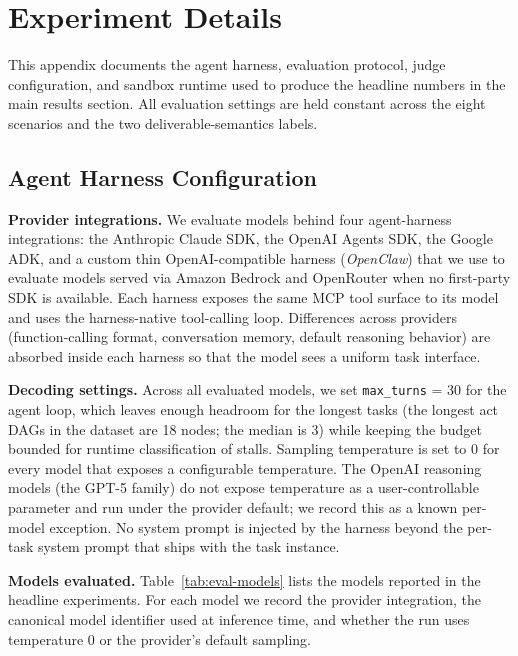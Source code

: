 \section{Experiment Details}
\label{app:experiment}

This appendix documents the agent harness, evaluation protocol, judge configuration, and sandbox runtime used to produce the headline numbers in the main results section. All evaluation settings are held constant across the eight scenarios and the two deliverable-semantics labels.

\subsection{Agent Harness Configuration}
\label{app:harness-config}

\textbf{Provider integrations.}
We evaluate models behind four agent-harness integrations: the Anthropic Claude SDK, the OpenAI Agents SDK, the Google ADK, and a custom thin OpenAI-compatible harness (\emph{OpenClaw}) that we use to evaluate models served via Amazon Bedrock and OpenRouter when no first-party SDK is available. Each harness exposes the same MCP tool surface to its model and uses the harness-native tool-calling loop. Differences across providers (function-calling format, conversation memory, default reasoning behavior) are absorbed inside each harness so that the model sees a uniform task interface.

\textbf{Decoding settings.}
Across all evaluated models, we set \texttt{max\_turns} = 30 for the agent loop, which leaves enough headroom for the longest tasks (the longest act DAGs in the dataset are 18 nodes; the median is 3) while keeping the budget bounded for runtime classification of stalls. Sampling temperature is set to $0$ for every model that exposes a configurable temperature. The OpenAI reasoning models (the GPT-5 family) do not expose temperature as a user-controllable parameter and run under the provider default; we record this as a known per-model exception. No system prompt is injected by the harness beyond the per-task system prompt that ships with the task instance.

\textbf{Models evaluated.}
Table~\ref{tab:eval-models} lists the models reported in the headline experiments. For each model we record the provider integration, the canonical model identifier used at inference time, and whether the run uses temperature $0$ or the provider's default sampling.


